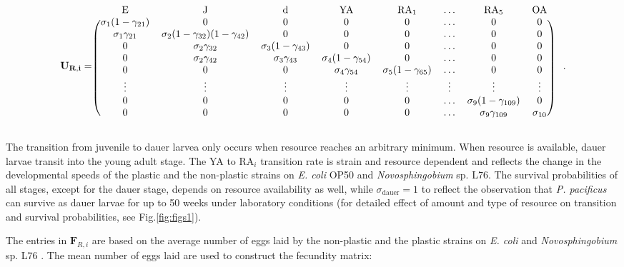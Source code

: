 \documentclass[10pt,letterpaper]{article}
\newcommand{\ecoli}{\emph{E. coli} OP50}
\newcommand{\novo}{\emph{Novosphingobium} sp. L76}
\newcommand{\ppac}{\emph{P. pacificus}}
\begin{document}
\begin{adjustwidth}{-2in}{0in}
\[ \mathbf{U_{R,i}}= \begin{blockarray}{cccccccc}
\mathrm{E} & \mathrm{J} & \mathrm{d} & \mathrm{YA} & \mathrm{RA}_1 & \hdots & \mathrm{RA}_5& \mathrm{OA} \\
\begin{block}{(cccccccc)}
\sigma_1 (1- \gamma_{21}) & 0 & 0 & 0 & 0 & \hdots & 0 & 0\\
\sigma_1 \gamma_{21} & \sigma_2 (1- \gamma_{32}) (1- \gamma_{42}) & 0 & 0 & 0 & \hdots & 0 & 0\\
0 & \sigma_2 \gamma_{32} & \sigma_3(1 - \gamma_{43}) & 0 & 0 & \hdots & 0 & 0\\
0 & \sigma_2\gamma_{42} & \sigma_3\gamma_{43} & \sigma_4(1 - \gamma_{54})  & 0 & \hdots & 0 & 0\\
0 & 0 & 0 & \sigma_4 \gamma_{54} & \sigma_5 (1 - \gamma_{65}) & \hdots & 0 & 0\\
\vdots & \vdots & \vdots & \vdots & \vdots & \vdots & \vdots & \vdots \\
0 & 0 & 0 & 0 & 0 & \hdots & \sigma_9 (1 - \gamma_{109})  & 0\\
0 & 0 & 0 & 0 & 0 & \hdots & \sigma_9 \gamma_{109}  & \sigma_{10}\\  
\end{block} 
\end{blockarray}  \quad . \] %
\end{adjustwidth}

The transition from juvenile to dauer larvea only occurs when resource reaches an arbitrary minimum. When resource is available, dauer larvae transit into the young adult stage. The YA to RA$_i$ transition rate is strain and resource dependent and reflects the change in the developmental speeds of the plastic and the non-plastic strains on \ecoli{} and \novo{}\cite{Dardiry2023}. The survival probabilities of all stages, except for the dauer stage, depends on resource availability as well, while $\sigma_{\mathrm{dauer}}=1$ to reflect the observation that \ppac{} can survive as dauer larvae for up to 50 weeks under laboratory conditions \cite{Mayer2011aa} (for detailed effect of amount and type of resource on transition and survival probabilities, see Fig.\ref{fig:figs1}).

\hspace{5cm}

The entries in $\mathbf{F}_{R,i}$ are based on the average number of eggs laid by the non-plastic and the plastic strains on \emph{E. coli} and \novo{} \cite{Dardiry2023}. The mean number of eggs laid are used to construct the fecundity matrix:
\end{document}
